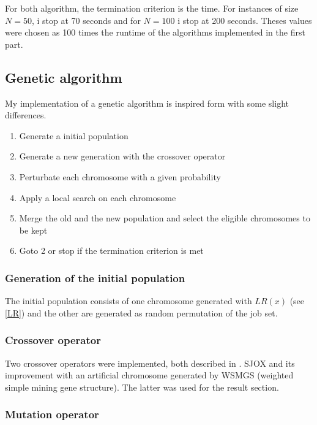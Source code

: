 \documentclass[a4paper]{article}
\begin{document}
For both algorithm, the termination criterion is the time. For instances of size $N=50$, i stop at 70 seconds and for $N=100$ i stop at 200 seconds. Theses values were chosen as 100 times the runtime of the algorithms implemented in the first part.


\subsection{Genetic algorithm}

My implementation of a genetic algorithm is inspired form \cite{zhang2009} with some slight differences.

\begin{enumerate}
    \item Generate a initial population
    \item Generate a new generation with the crossover operator
    \item Perturbate each chromosome with a given probability
    \item Apply a local search on each chromosome
    \item Merge the old and the new population and select the eligible chromosomes to be kept
    \item Goto 2 or stop if the termination criterion is met
\end{enumerate}

\subsubsection{Generation of the initial population}

The initial population consists of one chromosome generated with $LR(x)$ (see \ref{LR}) and the other
are generated as random permutation of the job set.

\subsubsection{Crossover operator}

Two crossover operators were implemented, both described in \cite{zhang2009}. SJOX and its improvement with an artificial chromosome generated by WSMGS (weighted simple mining gene structure). The latter was used for the result section.


\subsubsection{Mutation operator}
\end{document}
